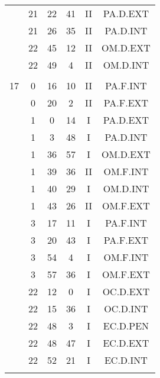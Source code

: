 \documentclass[12pt, a4paper]{article}
\begin{document}
\begin{multicols}{3}
{\begin{tabular}{c c c c c c}
	 	 	 	 & 21 & 22 & 41 & II & PA.D.EXT\\%
	 	 	 	 & 21 & 26 & 35 & II & PA.D.INT\\%
	 	 	 	 & 22 & 45 & 12 & II & OM.D.EXT\\%
	 	 	 	 & 22 & 49 & 4 & II & OM.D.INT\\%
	 	 	 	 & & & & & \\%
	 	 	 	17 & 0 & 16 & 10 & II & PA.F.INT\\%
	 	 	 	 & 0 & 20 & 2 & II & PA.F.EXT\\%
	 	 	 	 & 1 & 0 & 14 & I & PA.D.EXT\\%
	 	 	 	 & 1 & 3 & 48 & I & PA.D.INT\\%
	 	 	 	 & 1 & 36 & 57 & I & OM.D.EXT\\%
	 	 	 	 & 1 & 39 & 36 & II & OM.F.INT\\%
	 	 	 	 & 1 & 40 & 29 & I & OM.D.INT\\%
	 	 	 	 & 1 & 43 & 26 & II & OM.F.EXT\\%
	 	 	 	 & 3 & 17 & 11 & I & PA.F.INT\\%
	 	 	 	 & 3 & 20 & 43 & I & PA.F.EXT\\%
	 	 	 	 & 3 & 54 & 4 & I & OM.F.INT\\%
	 	 	 	 & 3 & 57 & 36 & I & OM.F.EXT\\%
	 	 	 	 & 22 & 12 & 0 & I & OC.D.EXT\\%
	 	 	 	 & 22 & 15 & 36 & I & OC.D.INT\\%
	 	 	 	 & 22 & 48 & 3 & I & EC.D.PEN\\%
	 	 	 	 & 22 & 48 & 47 & I & EC.D.EXT\\%
	 	 	 	 & 22 & 52 & 21 & I & EC.D.INT\\%
	 	 	 	 & & & & & \\%

\end{tabular}}
\end{multicols}
\end{document}
